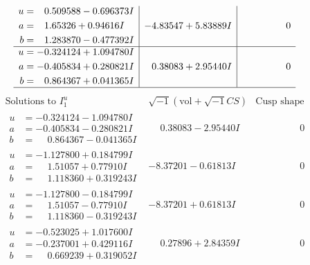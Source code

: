 \documentclass[1p]{elsarticle_modified}
\theoremstyle{definition}
\newcommand{\I}{\sqrt{-1}}
\begin{document}
$$\begin{array}{c|c|c}
\begin{aligned}
u &= \phantom{-}0.509588 - 0.696373 I \\
a &= \phantom{-}1.65326 + 0.94616 I \\
b &= \phantom{-}1.283870 - 0.477392 I\end{aligned}
 & -4.83547 + 5.83889 I & \phantom{-0.000000 } 0 \\ \hline\begin{aligned}
u &= -0.324124 + 1.094780 I \\
a &= -0.405834 + 0.280821 I \\
b &= \phantom{-}0.864367 + 0.041365 I\end{aligned}
 & \phantom{-}0.38083 + 2.95440 I & \phantom{-0.000000 } 0\\
 \hline 
 \end{array}$$\newpage$$\begin{array}{c|c|c}  
\text{Solutions to }I^u_{1}& \I (\text{vol} + \sqrt{-1}CS) & \text{Cusp shape}\\
 \hline 
\begin{aligned}
u &= -0.324124 - 1.094780 I \\
a &= -0.405834 - 0.280821 I \\
b &= \phantom{-}0.864367 - 0.041365 I\end{aligned}
 & \phantom{-}0.38083 - 2.95440 I & \phantom{-0.000000 } 0 \\ \hline\begin{aligned}
u &= -1.127800 + 0.184799 I \\
a &= \phantom{-}1.51057 + 0.77910 I \\
b &= \phantom{-}1.118360 + 0.319243 I\end{aligned}
 & -8.37201 - 0.61813 I & \phantom{-0.000000 } 0 \\ \hline\begin{aligned}
u &= -1.127800 - 0.184799 I \\
a &= \phantom{-}1.51057 - 0.77910 I \\
b &= \phantom{-}1.118360 - 0.319243 I\end{aligned}
 & -8.37201 + 0.61813 I & \phantom{-0.000000 } 0 \\ \hline\begin{aligned}
u &= -0.523025 + 1.017600 I \\
a &= -0.237001 + 0.429116 I \\
b &= \phantom{-}0.669239 + 0.319052 I\end{aligned}
 & \phantom{-}0.27896 + 2.84359 I & \phantom{-0.000000 } 0 \\ \hline\begin{aligned}

\end{aligned}
\end{array}$$
\end{document}
